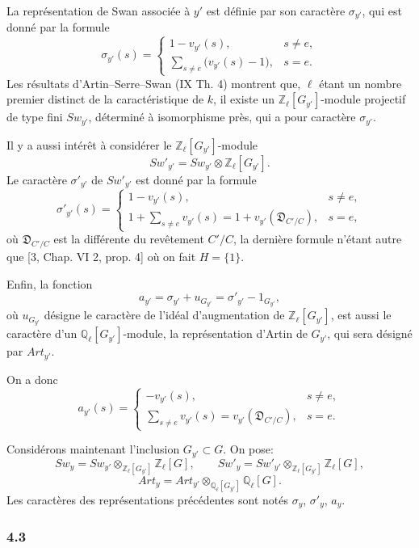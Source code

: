 \documentclass[11pt]{article}
\begin{document}
La représentation de Swan associée à $y'$ est définie par son caractère $\sigma_{y'}$, qui est donné par la formule
\[
\sigma_{y'}(s)=
\begin{cases}
1-v_{y'}(s),& s\ne e,\\[0.4em]
\displaystyle\sum_{s\ne e}\bigl(v_{y'}(s)-1\bigr),& s=e.
\end{cases}
\tag{4.2.2}
\]
Les résultats d'Artin--Serre--Swan (IX Th. 4) montrent que, $\ell$ étant un nombre premier distinct de la caractéristique de $k$, il existe un $\mathbb Z_\ell[G_{y'}]$-module projectif de type fini $Sw_{y'}$, déterminé à isomorphisme près, qui a pour caractère $\sigma_{y'}$.

Il y a aussi intérêt à considérer le $\mathbb Z_\ell[G_{y'}]$-module
\[
Sw'_{y'}=Sw_{y'}\otimes\mathbb Z_\ell[G_{y'}].
\tag{4.2.3}
\]
Le caractère $\sigma'_{y'}$ de $Sw'_{y'}$ est donné par la formule
\[
\sigma'_{y'}(s)=
\begin{cases}
1-v_{y'}(s),& s\ne e,\\[0.4em]
\displaystyle 1+\sum_{s\ne e}v_{y'}(s)
=1+v_{y'}(\mathfrak D_{C'/C}),& s=e,
\end{cases}
\tag{4.2.4}
\]
où $\mathfrak D_{C'/C}$ est la différente du revêtement $C'/C$, la dernière formule n'étant autre que [3, Chap. VI 2, prop. 4] où on fait $H=\{1\}$.

Enfin, la fonction
\[
a_{y'}=\sigma_{y'}+u_{G_{y'}}=\sigma'_{y'}-1_{G_{y'}},
\tag{4.2.5}
\]
où $u_{G_{y'}}$ désigne le caractère de l'idéal d'augmentation de $\mathbb Z_\ell[G_{y'}]$, est aussi le caractère d'un $\mathbb Q_\ell[G_{y'}]$-module, la représentation d'Artin de $G_{y'}$, qui sera désigné par $Art_{y'}$.

On a donc
\[
a_{y'}(s)=
\begin{cases}
-v_{y'}(s),& s\ne e,\\[0.4em]
\displaystyle\sum_{s\ne e}v_{y'}(s)=v_{y'}(\mathfrak D_{C'/C}),& s=e.
\end{cases}
\tag{4.2.6}
\]

Considérons maintenant l'inclusion $G_{y'}\subset G$. On pose:
\[
Sw_y=Sw_{y'}\otimes_{\mathbb Z_\ell[G_{y'}]}\mathbb Z_\ell[G],
\qquad
Sw'_y=Sw'_{y'}\otimes_{\mathbb Z_\ell[G_{y'}]}\mathbb Z_\ell[G],
\tag{4.2.7}
\]
\[
Art_y=Art_{y'}\otimes_{\mathbb Q_\ell[G_{y'}]}\mathbb Q_\ell[G].
\tag{4.2.8}
\]
Les caractères des représentations précédentes sont notés $\sigma_y$, $\sigma'_y$, $a_y$.

\subsubsection*{4.3}
\end{document}
